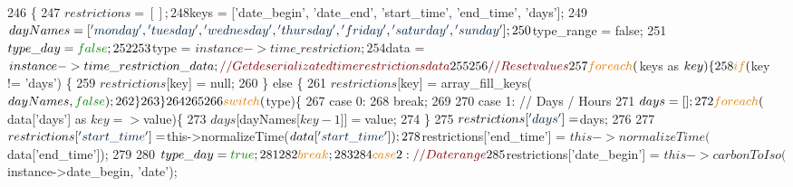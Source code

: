 \begin{DoxyCode}
246     \{
247         $restrictions = [];
248         $keys         = [\textcolor{stringliteral}{'date\_begin'}, \textcolor{stringliteral}{'date\_end'}, \textcolor{stringliteral}{'start\_time'}, \textcolor{stringliteral}{'end\_time'}, \textcolor{stringliteral}{'days'}];
249         $dayNames     = [\textcolor{stringliteral}{'monday'}, \textcolor{stringliteral}{'tuesday'}, \textcolor{stringliteral}{'wednesday'}, \textcolor{stringliteral}{'thursday'}, \textcolor{stringliteral}{'friday'}, \textcolor{stringliteral}{'saturday'}, \textcolor{stringliteral}{'sunday'}];
250         $type\_range   = \textcolor{keyword}{false};
251         $type\_day     = \textcolor{keyword}{false};
252         
253         $type         = $instance->time\_restriction;
254         $data         = $instance->time\_restriction\_data; \textcolor{comment}{// Get deserializated time restrictions data}
255         
256         \textcolor{comment}{// Reset values}
257         \textcolor{keywordflow}{foreach}($keys as $key)\{
258             \textcolor{keywordflow}{if} ($key != \textcolor{stringliteral}{'days'}) \{
259                 $restrictions[$key] = null;
260             \} \textcolor{keywordflow}{else} \{
261                 $restrictions[$key] = array\_fill\_keys($dayNames, \textcolor{keyword}{false});
262             \}
263         \}
264 
265                
266         \textcolor{keywordflow}{switch}($type)\{
267             \textcolor{keywordflow}{case} 0:
268                 \textcolor{keywordflow}{break};
269             
270             \textcolor{keywordflow}{case} 1: \textcolor{comment}{// Days / Hours}
271                 $days = [];
272                 \textcolor{keywordflow}{foreach}($data[\textcolor{stringliteral}{'days'}] as $key => $value)\{
273                     $days[ $dayNames[$key-1] ] = $value;
274                 \}
275                 $restrictions[\textcolor{stringliteral}{'days'}] = $days;
276 
277                 $restrictions[\textcolor{stringliteral}{'start\_time'}] = $this->normalizeTime($data[\textcolor{stringliteral}{'start\_time'}]);
278                 $restrictions[\textcolor{stringliteral}{'end\_time'}]   = $this->normalizeTime($data[\textcolor{stringliteral}{'end\_time'}]);
279                 
280                 $type\_day = \textcolor{keyword}{true};
281                 
282                 \textcolor{keywordflow}{break};
283             
284             \textcolor{keywordflow}{case} 2: \textcolor{comment}{// Date range}
285                 $restrictions[\textcolor{stringliteral}{'date\_begin'}] = $this->carbonToIso($instance->date\_begin, \textcolor{stringliteral}{'date'});

\end{DoxyCode}
